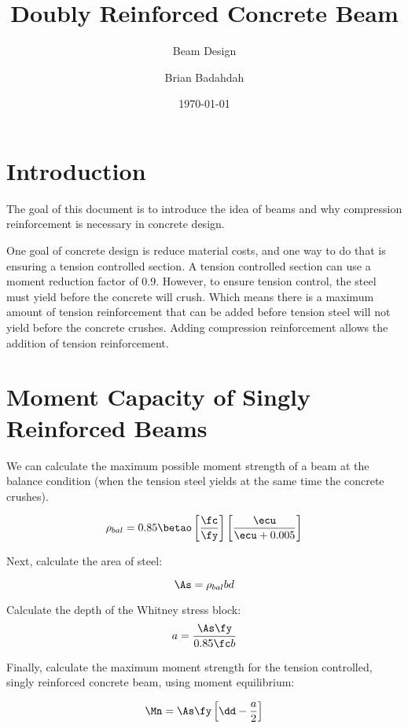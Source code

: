 \documentclass[landscape, twocolumn, 12pt]{article}
\title{Doubly Reinforced Concrete Beam}
\subtitle{Beam Design}
\author{Brian Badahdah}
\date{\today}
\begin{document}
\maketitle

\section{Introduction}
The goal of this document is to introduce the idea of  beams and why compression reinforcement is necessary in concrete design.

One goal of concrete design is reduce material costs, and one way to do that is ensuring a tension controlled section. A tension controlled section can use a moment reduction factor of 0.9. However, to ensure tension control, the steel must yield before the concrete will crush. Which means there is a maximum amount of tension reinforcement that can be added before tension steel will not yield before the concrete crushes. Adding compression reinforcement allows the addition of tension reinforcement.

\section{Moment Capacity of Singly Reinforced Beams}
We can calculate the maximum possible moment strength of a beam at the balance condition (when the tension steel yields at the same time the concrete crushes).

\begin{equation}
  \rho_{bal} = 0.85\betao
  \left[\frac{\fc}{\fy}\right]
  \left[ \frac{\ecu}{\ecu+0.005}\right]
\end{equation}

Next, calculate the area of steel:

\begin{equation}
  \As = \rho_{bal} bd
\end{equation}

Calculate the depth of the Whitney stress block:
\begin{equation}
  a = \frac{\As\fy}{0.85 \fc b}
\end{equation}

Finally, calculate the maximum moment strength for the tension controlled, singly reinforced concrete beam, using moment equilibrium:

\begin{equation}
  \Mn = \As\fy \left[\dd-\frac{a}{2}\right]
\end{equation}
\end{document}
